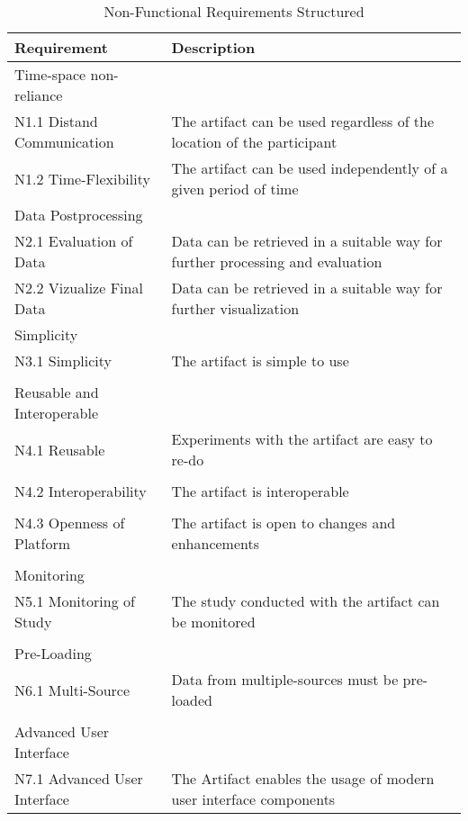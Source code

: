 \begin{table}
    \centering
    \small
    \begin{tabular}{L{0.35\textwidth}L{0.59\textwidth}}
    \hline
Requirement                             & Description \\ \hline
    Time-space non-reliance     &             \\ \hline
    N1.1 Distand Communication      & The artifact can be used regardless of the location of the participant            \\
    N1.2 Time-Flexibility           & The artifact can be used independently of a given period of time            \\ \hline
    Data Postprocessing &             \\ \hline
    N2.1 Evaluation of Data         & Data can be retrieved in a suitable way for further processing and evaluation            \\
    N2.2 Vizualize Final Data       & Data can be retrieved in a suitable way for further visualization             \\ \hline
    Simplicity                  &            \\ \hline
    N3.1 Simplicity                 & The artifact is simple to use           \\
    & \\ \hline
    Reusable and Interoperable  &             \\ \hline
    N4.1 Reusable                   & Experiments with the artifact are easy to re-do           \\
    & \\
    N4.2 Interoperability           & The artifact is interoperable            \\
    & \\
    N4.3 Openness of Platform       & The artifact is open to changes and enhancements \\
    & \\ \hline
    Monitoring                  &             \\ \hline
    N5.1 Monitoring of Study        & The study conducted with the artifact can be monitored            \\ 
    & \\ \hline
    Pre-Loading                 &             \\ \hline
    N6.1 Multi-Source             & Data from multiple-sources must be pre-loaded            \\ 
    & \\ \hline
    Advanced User Interface   &             \\ \hline
    N7.1 Advanced User Interface  & The Artifact enables the usage of modern user interface components            \\ \hline
    \end{tabular}
    \caption[Non-Functional Requirements Structured]{Non-Functional Requirements Structured}\label{tab:NonFuncRequirementsCat}
    \end{table}
\newpage


